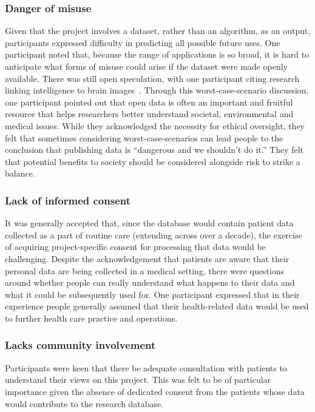 \documentclass{article}
\begin{document}
  
\subsubsection{Danger of misuse}

Given that the project involves a dataset, rather than an algorithm,
as an output, participants expressed difficulty in
predicting all possible future uses. One participant noted that,
because the range of applications is so broad, it is hard to
anticipate what forms of misuse could arise if the dataset were made
openly available. There was still open speculation, with one
participant citing research linking intelligence to brain
images~\cite{dubois}. Through this worst-case-scenario discussion,
one participant pointed out that open data is often an important and
fruitful resource that helps researchers better understand societal,
environmental and medical issues. While they acknowledged the
necessity for ethical oversight, they felt that sometimes considering
worst-case-scenarios can lead people to the conclusion that publishing data
is ``dangerous and we shouldn't do it.'' They felt that potential
benefits to society should be considered alongside risk to strike a
balance. 

\subsubsection{Lack of informed consent}

It was generally accepted that, since the database would contain
patient data collected as a part of routine care (extending across
over a decade), the exercise of
acquiring project-specific consent for processing that data would be
challenging. Despite the acknowledgement that patients are aware that
their personal data are being collected in a medical setting, there
were questions around whether people can really understand what
happens to their data and what it could be subsequently used for.
One participant expressed that in their experience people generally
assumed that their health-related data would be used to further
health care practice and operations.


\subsubsection{Lacks community involvement}

Participants were keen that there be adequate consultation with
patients to understand their views on this project. This was felt to
be of particular importance given the absence of dedicated consent
from the patients whose data would contribute to the research
database. 
\end{document}
